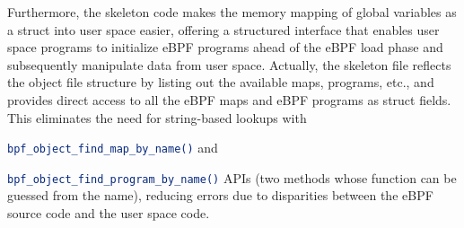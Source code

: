 Furthermore, the skeleton code makes the memory mapping of global variables as a struct into user space easier, offering a structured interface that enables user space programs to initialize eBPF programs ahead of the eBPF load phase and subsequently manipulate data from user space.
Actually, the skeleton file reflects the object file structure by listing out the available maps, programs, etc., and provides direct access to all the eBPF maps and eBPF programs as struct fields. 
This eliminates the need for string-based lookups with \raggedright\colorbox{backcolour}{\lstinline[style=commandline, language=bash]|bpf_object_find_map_by_name()|} and \raggedright\colorbox{backcolour}{\lstinline[style=commandline, language=bash]|bpf_object_find_program_by_name()|} APIs (two methods whose function can be guessed from the name), reducing errors due to disparities between the eBPF source code and the user space code.